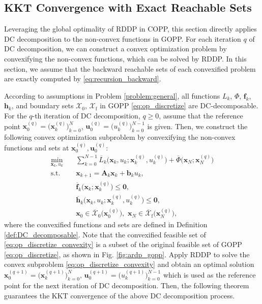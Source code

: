 \documentclass[journal]{IEEEtran}
\theoremstyle{definition}
\theoremstyle{definition}
\newcommand\st{{\text{s.t.}}}
\renewcommand\vector[1]{\boldsymbol{#1}}
\newcommand\vb{{\vector{b}}}
\newcommand\vf{{\vector{f}}}
\newcommand\vh{{\vector{h}}}
\newcommand\vx{{\vector{x}}}
\newcommand\vA{{\vector{A}}}
\newcommand\vzero{{\vector{0}}}
\newcommand\bx{{\mathbf{x}}}
\newcommand\bu{{\mathbf{u}}}
\begin{document}
\subsection{KKT Convergence with Exact Reachable Sets}\label{subsec:KKT_GOPP_exact_backward}

Leveraging the global optimality of RDDP in COPP, this section directly applies DC decomposition to the non-convex functions in GOPP. For each iteration $q$ of DC decomposition, we can construct a convex optimization problem by convexifying the non-convex functions, which can be solved by RDDP. In this section, we assume that the backward reachable sets of each convexified problem are exactly computed by \eqref{eq:recursion_backward}.

According to assumptions in Problem \ref{problem:general}, all functions $L_k$, $\Phi$, $\vf_k$, $\vh_k$, and boundary sets $\mathcal{X}_0$, $\mathcal{X}_\text{f}$ in GOPP \eqref{eq:op_discretize} are DC-decomposable. For the $q$-th iteration of DC decomposition, $q\geq0$, assume that the reference point $\bx_0^{(q)}=\Big(\vx_k^{(q)}\Big)_{k=0}^{N}$, $\bu_0^{(q)}=\Big(u_k^{(q)}\Big)_{k=0}^{N-1}$ is given. Then, we construct the following convex optimization subproblem by convexifying the non-convex functions and sets at $\bx_0^{(q)},\bu_0^{(q)}$:
\begin{subequations}\label{eq:op_discretize_convexity}
    \begin{align}
        \min_{\vx_k,u_k} \quad &\sum_{k=0}^{N-1} \overline{L}_k\Big(\vx_k, u_k; \vx_k^{(q)},u_k^{(q)}\Big) + \overline{\Phi}\Big(\vx_N;\vx_N^{(q)}\Big) \label{eq:op_discretize_convexity_objective}\\
        \st \quad & \vx_{k+1} = \vA_k\vx_k + \vb_k u_k,\label{eq:op_discretize_convexity_dynamics} \\
        &\overline{\vf}_k\Big(\vx_k;\vx_k^{(q)}\Big) \leq \vzero, \label{eq:op_discretize_convexity_state_constraints}\\
        &\overline{\vh}_k\Big(\vx_k, u_k; \vx_k^{(q)}, u_k^{(q)}\Big) \leq \vzero,\label{eq:op_discretize_convexity_mix_constraints}\\
        &\vx_0\in\overline{\mathcal{X}}_0\Big(\vx_0^{(q)}\Big), \,\,\vx_N\in\overline{\mathcal{X}}_\text{f}\Big(\vx_N^{(q)}\Big),\label{eq:op_discretize_convexity_boundary_constraints}
    \end{align}
\end{subequations}
where the convexified functions and sets are defined in Definition \ref{def:DC_decomposable}. Note that the convexified feasible set of \eqref{eq:op_discretize_convexity} is a subset of the original feasible set of GOPP \eqref{eq:op_discretize}, as shown in Fig. \ref{fig:ardp_gopp}. Apply RDDP to solve the convex subproblem \eqref{eq:op_discretize_convexity} and obtain an optimal solution $\bx_0^{(q+1)}=\Big(\vx_k^{(q+1)}\Big)_{k=0}^{N}$, $\bu_0^{(q+1)}=\Big(u_k^{(q+1)}\Big)_{k=0}^{N-1}$ which is used as the reference point for the next iteration of DC decomposition. Then, the following theorem guarantees the KKT convergence of the above DC decomposition process.
\end{document}
